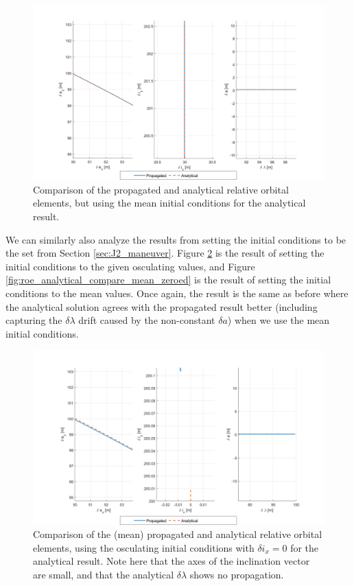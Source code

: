 \begin{figure}[H]
    \centering
    \includegraphics[width=0.8\linewidth]{sim/figures/PS4/ROE_analytical_compare_mean_IC2_SV2.png}
    \caption{Comparison of the propagated and analytical relative orbital elements, but using the mean initial conditions for the analytical result.}
\label{fig:roe_analytical_compare_mean}
\end{figure}

We can similarly also analyze the results from setting the initial conditions to be the set from Section \ref{sec:J2_maneuver}. Figure \ref{fig:roe_analytical_compare_osc_zeroed} is the result of setting the initial conditions to the given osculating values, and Figure \ref{fig:roe_analytical_compare_mean_zeroed} is the result of setting the initial conditions to the mean values. Once again, the result is the same as before where the analytical solution agrees with the propagated result better (including capturing the $\delta \lambda$ drift caused by the non-constant $\delta a$) when we use the mean initial conditions.

\begin{figure}[H]
    \centering
    \includegraphics[width=0.8\linewidth]{sim/figures/PS4/ROE_analytical_compare_given_IC3_SV2.png}
    \caption{Comparison of the (mean) propagated and analytical relative orbital elements, using the osculating initial conditions with $\delta i_x = 0$ for the analytical result. Note here that the axes of the inclination vector are small, and that the analytical $\delta \lambda$ shows no propagation.}
\label{fig:roe_analytical_compare_osc_zeroed}
\end{figure}

